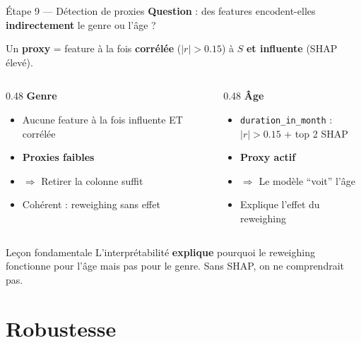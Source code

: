 \documentclass[aspectratio=169, 11pt]{beamer}
\begin{document}
\begin{frame}{\'Etape 9 --- D\'etection de proxies}
\textbf{Question} : des features encodent-elles \textbf{indirectement} le genre ou l'\^age ?

\vspace{0.3em}
Un \textbf{proxy} = feature \`a la fois \textbf{corr\'el\'ee} ($|r| > 0.15$) \`a $S$ \textbf{et influente} (SHAP \'elev\'e).

\vspace{0.5em}
\begin{columns}[T]
\begin{column}{0.48\textwidth}
\textbf{\textcolor{accent}{Genre}}
\begin{itemize}
    \item Aucune feature \`a la fois influente ET corr\'el\'ee
    \item \textbf{Proxies faibles}
    \item $\Rightarrow$ Retirer la colonne suffit
    \item Coh\'erent : reweighing sans effet
\end{itemize}
\end{column}
\begin{column}{0.48\textwidth}
\textbf{\textcolor{fair}{\^Age}}
\begin{itemize}
    \item \texttt{duration\_in\_month} :\\ $|r| > 0.15$ + top 2 SHAP
    \item \textbf{Proxy actif}
    \item $\Rightarrow$ Le mod\`ele ``voit'' l'\^age
    \item Explique l'effet du reweighing
\end{itemize}
\end{column}
\end{columns}

\vspace{0.5em}
\begin{block}{Le\c{c}on fondamentale}
L'interpr\'etabilit\'e \textbf{explique} pourquoi le reweighing fonctionne pour l'\^age mais pas pour le genre. Sans SHAP, on ne comprendrait pas.
\end{block}
\end{frame}

\section{Robustesse}
\end{document}
